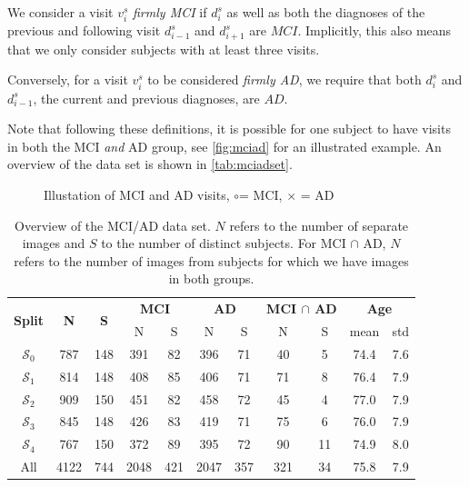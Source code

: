 We consider a visit $v^s_i$ \textit{firmly MCI} if $d^s_i$ as well as both the diagnoses of the previous and following visit $d^s_{i-1}$ and $d^s_{i+1}$ are $MCI$. Implicitly, this also means that we only consider subjects with at least three visits.

Conversely, for a visit $v^s_i$ to be considered \textit{firmly AD}, we require that both $d^s_i$ and $d^s_{i-1}$, the current and previous diagnoses, are $AD$.

Note that following these definitions, it is possible for one subject to have visits in both the MCI \textit{and} AD group, see \autoref{fig:mciad} for an illustrated example. An overview of the data set is shown in \autoref{tab:mciadset}.

\begin{figure}[h]
	\centering
	
	\caption{Illustation of MCI and AD visits, \Large$\circ$\normalsize\;= MCI, $\times$ = AD}
	\label{fig:mciad}
\end{figure}

\vspace{20pt}

\begin{table}[h]
	\begin{center}
		\begin{tabular}{c c c c c c c c c c c}
			\toprule
			\multirow{2}{*}{\bfseries Split} & 
			\multirow{2}{*}{\bfseries N} & 
			\multirow{2}{*}{\bfseries S} & 
			\multicolumn{2}{c}{\bfseries MCI} & 
			\multicolumn{2}{c}{\bfseries AD} & 
			\multicolumn{2}{c}{\bfseries MCI $\cap$ AD} &
			\multicolumn{2}{c}{\bfseries Age} \\
			\cmidrule(lr){4-5}
			\cmidrule(lr){6-7}
			\cmidrule(lr){8-9}
			\cmidrule(lr){10-11} 
			& & & N & S & N & S & N & S & mean & std \\ 
			\cmidrule(lr){1-11}
			$\mathcal{S}_0$ &  787 & 148 &  391 &  82 &  396 &  71 &  40 &  5 & 74.4 & 7.6 \\
			$\mathcal{S}_1$ &  814 & 148 &  408 &  85 &  406 &  71 &  71 &  8 & 76.4 & 7.9 \\
			$\mathcal{S}_2$ &  909 & 150 &  451 &  82 &  458 &  72 &  45 &  4 & 77.0 & 7.9 \\
			$\mathcal{S}_3$ &  845 & 148 &  426 &  83 &  419 &  71 &  75 &  6 & 76.0 & 7.9 \\
			$\mathcal{S}_4$ &  767 & 150 &  372 &  89 &  395 &  72 &  90 & 11 & 74.9 & 8.0 \\
			\cmidrule(lr){1-11}
			All             & 4122 & 744 & 2048 & 421 & 2047 & 357 & 321 & 34 & 75.8 & 7.9 \\
			\bottomrule
		\end{tabular}
		\caption{Overview of the MCI/AD data set. $N$ refers to the number of separate images and $S$ to the number of distinct subjects. For MCI $\cap$ AD, $N$ refers to the number of images from subjects for which we have images in both groups.}
		\label{tab:mciadset}
	\end{center}
\end{table}

